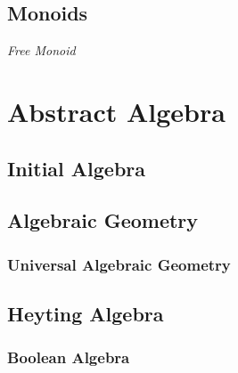 \documentclass{article}
\begin{document}
\subsection{Monoids}\label{subsec:monoids}

\emph{Free Monoid}

\section{Abstract Algebra}\label{sec:abstract_algebra}

\subsection{Initial Algebra}\label{subsec:initial_algebra}

\subsection{Algebraic Geometry}\label{subsec:algebraic_geometry}

\subsubsection{Universal Algebraic Geometry}

\subsection{Heyting Algebra}\label{subsec:heyting_algebra}

\subsubsection{Boolean Algebra}\label{subsec:boolean_algebra}

\end{document}
